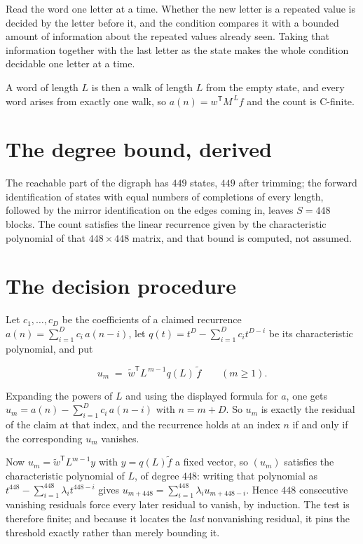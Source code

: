 \documentclass[11pt]{article}
\theoremstyle{definition}
\begin{document}
Read the word one letter at a time. Whether the new letter is a repeated value is decided by the letter before it, and the condition compares it with a bounded amount of information about the repeated values already seen. Taking that information together with the last letter as the state makes the whole condition decidable one letter at a time.

A word of length $L$ is then a walk of length $L$ from the empty state, and every word arises from exactly one walk, so $a(n) = w^{\mathsf T}M^{\,L}f$ and the count is C-finite.

\section{The degree bound, derived}

The reachable part of the digraph has $449$ states, $449$ after trimming; the forward identification of states with equal numbers of completions of every length, followed by the mirror identification on the edges coming in, leaves $S = 448$ blocks. The count satisfies the linear recurrence given by the characteristic polynomial of that $448\times448$ matrix, and that bound is computed, not assumed.

\section{The decision procedure}

Let $c_1,\dots,c_D$ be the coefficients of a claimed recurrence $a(n) = \sum_{i=1}^{D} c_i\,a(n-i)$, let $q(t) = t^{D} - \sum_{i=1}^{D} c_i t^{D-i}$ be its characteristic polynomial, and put

\[u_m \;=\; \tilde w^{\mathsf T} L^{\,m-1} q(L)\,\tilde f \qquad (m \ge 1).\]

Expanding the powers of $L$ and using the displayed formula for $a$, one gets $u_m = a(n) - \sum_{i=1}^{D} c_i\,a(n-i)$ with $n = m + D$. So $u_m$ is exactly the residual of the claim at that index, and the recurrence holds at an index $n$ if and only if the corresponding $u_m$ vanishes.

Now $u_m = \tilde w^{\mathsf T} L^{m-1} y$ with $y = q(L)\tilde f$ a fixed vector, so $(u_m)$ satisfies the characteristic polynomial of $L$, of degree $448$: writing that polynomial as $t^{448} - \sum_{i=1}^{448} \lambda_i t^{448-i}$ gives $u_{m+448} = \sum_{i=1}^{448} \lambda_i u_{m+448-i}$. Hence $448$ consecutive vanishing residuals force every later residual to vanish, by induction. The test is therefore finite; and because it locates the {\itshape last} nonvanishing residual, it pins the threshold exactly rather than merely bounding it.
\end{document}
